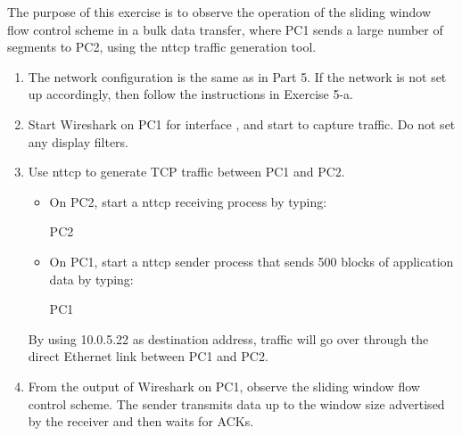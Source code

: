 The purpose of this exercise is to observe the operation of the sliding window flow control scheme in a bulk data transfer, where PC1 sends a large number of segments to PC2, using the nttcp traffic generation tool.
\begin{enumerate}
	\item The network configuration is the same as in Part 5. If the network is not set up accordingly, then follow the instructions in Exercise 5-a.
	\item Start Wireshark on PC1 for interface , and start to capture traffic. Do not set any display filters.
	\item Use nttcp to generate TCP traffic between PC1 and PC2.
		\begin{itemize}
			\item On PC2, start a nttcp receiving process by typing:
				\begin{cmdblock}
	PC2%
				\end{cmdblock}
			\item On PC1, start a nttcp sender process that sends 500 blocks of application data by typing:
				\begin{cmdblock}
	PC1%
				\end{cmdblock}
		\end{itemize}
		By using 10.0.5.22 as destination address, traffic will go over through the direct Ethernet link between PC1 and PC2.
	\item From the output of Wireshark on PC1, observe the sliding window flow control scheme. The sender transmits data up to the window size advertised by the receiver and then waits for ACKs.
\end{enumerate}


